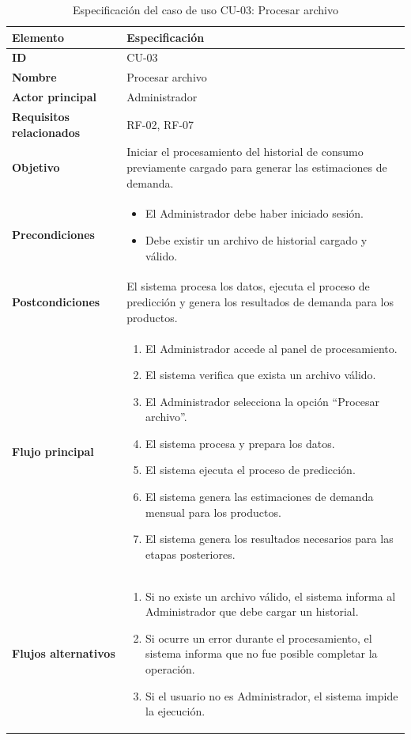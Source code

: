 \begin{table}[H]
\centering
\caption{Especificación del caso de uso CU-03: Procesar archivo}
\label{tab:cu03_procesar_archivo}
\renewcommand{\arraystretch}{1.3}
\begin{tabularx}{\textwidth}{|>{\bfseries}p{3.5cm}|X|}
\hline
Elemento & Especificación \\
\hline
ID & CU-03 \\
\hline
Nombre & Procesar archivo \\
\hline
Actor principal & Administrador \\
\hline
Requisitos relacionados & RF-02, RF-07 \\
\hline
Objetivo & Iniciar el procesamiento del historial de consumo previamente cargado para generar las estimaciones de demanda. \\
\hline
Precondiciones &
\begin{itemize}
    \item El Administrador debe haber iniciado sesión.
    \item Debe existir un archivo de historial cargado y válido.
\end{itemize} \\
\hline
Postcondiciones & El sistema procesa los datos, ejecuta el proceso de predicción y genera los resultados de demanda para los productos. \\
\hline
Flujo principal &
\begin{enumerate}
    \item El Administrador accede al panel de procesamiento.
    \item El sistema verifica que exista un archivo válido.
    \item El Administrador selecciona la opción ``Procesar archivo''.
    \item El sistema procesa y prepara los datos.
    \item El sistema ejecuta el proceso de predicción.
    \item El sistema genera las estimaciones de demanda mensual para los productos.
    \item El sistema genera los resultados necesarios para las etapas posteriores.
\end{enumerate} \\
\hline
Flujos alternativos &
\begin{enumerate}
    \item Si no existe un archivo válido, el sistema informa al Administrador que debe cargar un historial.
    \item Si ocurre un error durante el procesamiento, el sistema informa que no fue posible completar la operación.
    \item Si el usuario no es Administrador, el sistema impide la ejecución.
\end{enumerate} \\
\hline
\end{tabularx}
\end{table}

